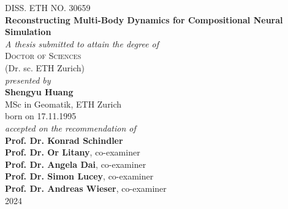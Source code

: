
\begin{center}
	\large{DISS. ETH NO. 30659}\\
\vspace{2 cm}
	\Large{\textbf{Reconstructing Multi-Body Dynamics for Compositional Neural Simulation}}\\
\vspace{1.5 cm}
	\large{\emph{A thesis submitted to attain the degree of}}\\
\vspace{0.5cm}
	\large{\textsc{Doctor of Sciences}}\\
\vspace{0.3cm}
	\large{(Dr. sc. ETH Zurich)}\\
\vspace{1.5cm}
	\large{\emph{presented by}}\\
\vspace{1.5cm}
	\large{\textbf{Shengyu Huang}}\\
\vspace{0.3cm}
	\large{MSc in Geomatik, ETH Zurich}\\
\vspace{0.3cm}
	\large{born on 17.11.1995}\\
\vspace{1.5cm}
	\large{\emph{accepted on the recommendation of}}\\
\vspace{1.5cm}
	\large{\textbf{Prof. Dr. Konrad Schindler} %
}\\
\vspace{0.1cm}
	\large{\textbf{Prof. Dr. Or Litany}, co-examiner %
}\\
\vspace{0.1cm}
	\large{\textbf{Prof. Dr. Angela Dai}, co-examiner %
}\\
\vspace{0.1cm}
	\large{\textbf{Prof. Dr. Simon Lucey}, co-examiner %
}\\
\vspace{0.1cm}
	\large{\textbf{Prof. Dr. Andreas Wieser}, co-examiner %
}\\

\vspace{1.5cm}
	\large{2024}
\end{center}


